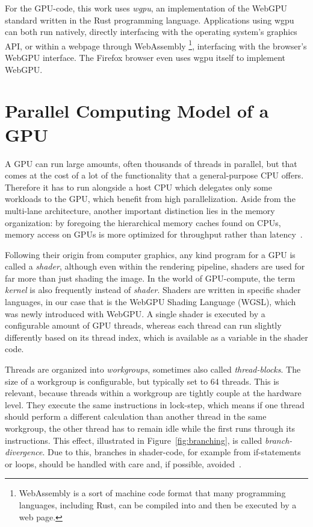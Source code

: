 For the GPU-code, this work uses \emph{wgpu}, an implementation of the WebGPU
standard written in the Rust programming language.
Applications using wgpu can both run natively, directly interfacing with the
operating system's graphics API,
or within a webpage through WebAssembly%
\footnote{WebAssembly is a sort of machine code format that many programming
languages, including Rust, can be compiled into
and then be executed by a web page.},
interfacing with the browser's WebGPU interface.
The Firefox browser even uses wgpu itself to implement WebGPU\@.


\section{Parallel Computing Model of a GPU}\label{sec:gpu_model}

A GPU can run large amounts, often thousands of threads in parallel,
but that comes at the cost of a lot of the functionality
that a general-purpose CPU offers.
Therefore it has to run alongside a host CPU which delegates only some
workloads to the GPU, which benefit from high parallelization.
Aside from the multi-lane architecture, another important distinction lies in
the memory organization:
by foregoing the hierarchical memory caches found on CPUs,
memory access on GPUs is more optimized for throughput rather than
latency~\cite{Patterson2016}.

Following their origin from computer graphics, any kind program for a GPU is
called a \emph{shader}, although even within the rendering pipeline, shaders
are used for far more than just shading the image.
In the world of GPU-compute, the term \emph{kernel} is also frequently instead
of \emph{shader}.
Shaders are written in specific shader languages,
in our case that is the WebGPU Shading Language (WGSL),
which was newly introduced with WebGPU\@.
A single shader is executed by a configurable amount of GPU threads,
whereas each thread can run slightly differently based on its thread index,
which is available as a variable in the shader code.

Threads are organized into \emph{workgroups},
sometimes also called \emph{thread-blocks}.
The size of a workgroup is configurable,
but typically set to 64 threads.
This is relevant,
because threads within a workgroup are tightly couple at the hardware level.
They execute the same instructions in lock-step,
which means if one thread should perform a different calculation than another
thread in the same workgroup,
the other thread has to remain idle while the first runs through its
instructions.
This effect, illustrated in Figure~\ref{fig:branching}, is called
\emph{branch-divergence}.
Due to this, branches in shader-code,
for example from if-statements or loops,
should be handled with care and, if possible, avoided~\cite{Hijma2023}.


